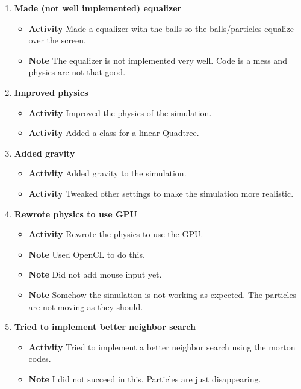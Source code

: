 \documentclass{article}
\begin{document}
\begin{enumerate}
    \item \textbf{Made (not well implemented) equalizer}
          \begin{itemize}
              \item \textbf{Activity} Made a equalizer with the  balls so the balls/particles equalize over the screen.
              \item \textbf{Note} The equalizer is not implemented very well. Code is a mess and physics are not that good.
          \end{itemize}

    \item \textbf{Improved physics}
          \begin{itemize}
              \item \textbf{Activity} Improved the physics of the simulation.
              \item \textbf{Activity} Added a class for a linear Quadtree.
          \end{itemize}

    \item \textbf{Added gravity}
          \begin{itemize}
              \item \textbf{Activity} Added gravity to the simulation.
              \item \textbf{Activity} Tweaked other settings to make the simulation more realistic.
          \end{itemize}

    \item \textbf{Rewrote physics to use GPU}
            \begin{itemize}
                \item \textbf{Activity} Rewrote the physics to use the GPU.
                \item \textbf{Note} Used OpenCL to do this.
                \item \textbf{Note} Did not add mouse input yet.
                \item \textbf{Note} Somehow the simulation is not working as expected. The particles are not moving as they should.
            \end{itemize}

    \item \textbf{Tried to implement better neighbor search}
            \begin{itemize}
                \item \textbf{Activity} Tried to implement a better neighbor search using the morton codes.
                \item \textbf{Note} I did not succeed in this. Particles are just disappearing.
            \end{itemize}

\end{enumerate}
\end{document}
